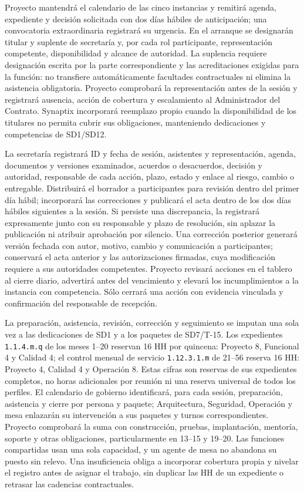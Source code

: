 Proyecto mantendrá el calendario de las cinco instancias y remitirá agenda, expediente y decisión solicitada con dos días hábiles de anticipación; una convocatoria extraordinaria registrará su urgencia. En el arranque se designarán titular y suplente de secretaría y, por cada rol participante, representación competente, disponibilidad y alcance de autoridad. La suplencia requiere designación escrita por la parte correspondiente y las acreditaciones exigidas para la función: no transfiere automáticamente facultades contractuales ni elimina la asistencia obligatoria. Proyecto comprobará la representación antes de la sesión y registrará ausencia, acción de cobertura y escalamiento al Administrador del Contrato. Synaptix incorporará reemplazo propio cuando la disponibilidad de los titulares no permita cubrir sus obligaciones, manteniendo dedicaciones y competencias de SD1/SD12.

La secretaría registrará ID y fecha de sesión, asistentes y representación, agenda, documentos y versiones examinados, acuerdos o desacuerdos, decisión y autoridad, responsable de cada acción, plazo, estado y enlace al riesgo, cambio o entregable. Distribuirá el borrador a participantes para revisión dentro del primer día hábil; incorporará las correcciones y publicará el acta dentro de los dos días hábiles siguientes a la sesión. Si persiste una discrepancia, la registrará expresamente junto con su responsable y plazo de resolución, sin aplazar la publicación ni atribuir aprobación por silencio. Una corrección posterior generará versión fechada con autor, motivo, cambio y comunicación a participantes; conservará el acta anterior y las autorizaciones firmadas, cuya modificación requiere a sus autoridades competentes. Proyecto revisará acciones en el tablero al cierre diario, advertirá antes del vencimiento y elevará los incumplimientos a la instancia con competencia. Sólo cerrará una acción con evidencia vinculada y confirmación del responsable de recepción.

La preparación, asistencia, revisión, corrección y seguimiento se imputan una sola vez a las dedicaciones de SD1 y a los paquetes de SD7/T-15. Los expedientes \texttt{1.1.4.m.q} de los meses 1--20 reservan 16 HH por quincena: Proyecto 8, Funcional 4 y Calidad 4; el control mensual de servicio \texttt{1.12.3.1.m} de 21--56 reserva 16 HH: Proyecto 4, Calidad 4 y Operación 8. Estas cifras son reservas de sus expedientes completos, no horas adicionales por reunión ni una reserva universal de todos los perfiles. El calendario de gobierno identificará, para cada sesión, preparación, asistencia y cierre por persona y paquete; Arquitectura, Seguridad, Operación y mesa enlazarán su intervención a sus paquetes y turnos correspondientes. Proyecto comprobará la suma con construcción, pruebas, implantación, mentoría, soporte y otras obligaciones, particularmente en 13--15 y 19--20. Las funciones compartidas usan una sola capacidad, y un agente de mesa no abandona su puesto sin relevo. Una insuficiencia obliga a incorporar cobertura propia y nivelar el registro antes de asignar el trabajo, sin duplicar las HH de un expediente o retrasar las cadencias contractuales.

